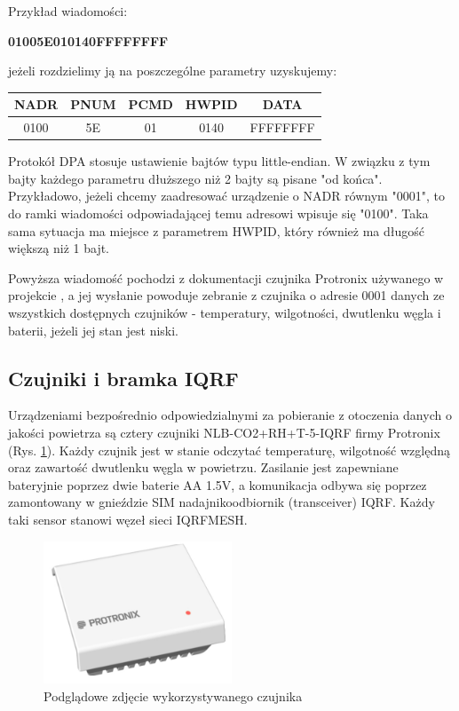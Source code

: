Przykład wiadomości:

\begin{center}
    \textbf{01005E010140FFFFFFFF}
\end{center}

jeżeli rozdzielimy ją na poszczególne parametry uzyskujemy:

\begin{table}[h]
    \centering
    \begin{tabular}{|c|c|c|c|c|}
    \hline
    NADR & PNUM & PCMD & HWPID & DATA \\ \hline
    0100 & 5E & 01 & 0140 & FFFFFFFF \\ \hline
    \end{tabular}
\end{table}

Protokół DPA stosuje ustawienie bajtów typu little-endian. W związku z tym bajty każdego parametru dłuższego
niż 2 bajty są pisane "od końca". Przykładowo, jeżeli chcemy zaadresować urządzenie o NADR równym "0001", to 
do ramki wiadomości odpowiadającej temu adresowi wpisuje się "0100". Taka sama sytuacja ma miejsce z parametrem
HWPID, który również ma długość większą niż 1 bajt.

Powyższa wiadomość pochodzi z dokumentacji czujnika Protronix używanego w projekcie \cite{protronix-comms}, a jej 
wysłanie powoduje zebranie z czujnika o adresie 0001 danych ze wszystkich dostępnych czujników - temperatury, 
wilgotności, dwutlenku węgla i baterii, jeżeli jej stan jest niski.

\subsection{Czujniki i bramka IQRF}

Urządzeniami bezpośrednio odpowiedzialnymi za pobieranie z otoczenia danych o jakości powietrza są cztery czujniki NLB-CO2+RH+T-5-IQRF firmy
Protronix (Rys. \ref{czujnik}). Każdy czujnik jest w stanie odczytać temperaturę, wilgotność względną oraz zawartość dwutlenku węgla w powietrzu. Zasilanie jest zapewniane
bateryjnie poprzez dwie baterie AA 1.5V, a komunikacja odbywa się poprzez zamontowany w gnieździe SIM nadajnikoodbiornik (transceiver) IQRF.
Każdy taki sensor stanowi węzeł sieci IQRFMESH.

\begin{figure}[H]
    \centering
    \includegraphics[width=0.5\textwidth]{zdj/NLB-CO2RHT-5-IQRF.jpg}
    \caption{Podglądowe zdjęcie wykorzystywanego czujnika \cite{protronix-product}}
    \label{czujnik}
\end{figure}

